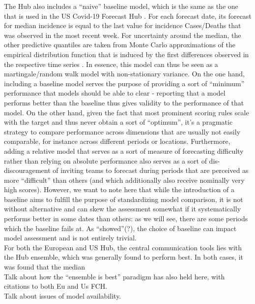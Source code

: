 The Hub also includes a ``naive'' baseline model, which is the same as the one that is used in the US Covid-19 Forecast Hub \cite{cramer_evaluation_2022}. For each forecast date, its forecast for median incidence is equal to the last value for incidence Cases/Deaths that was observed in the most recent week. For uncertainty around the median, the other predictive quantiles are taken from Monte Carlo approximations of the empirical distribution function that is induced by the first differences observed in the respective time series \citep{cramer_evaluation_2022}. In essence, this model can thus be seen as a martingale/random walk model with non-stationary variance. On the one hand, including a baseline model serves the purpose of providing a sort of ``minimum'' performance that models should be able to clear - reporting that a model performs better than the baseline thus gives validity to the performance of that model. On the other hand, given the fact that most prominent scoring rules scale with the target and thus never obtain a sort of ``optimum'', it's a pragmatic strategy to compare performance across dimensions that are usually not easily comparable, for instance across different periods or locations. Furthermore, adding a relative model that serves as a sort of measure of forecasting difficulty rather than relying on absolute performance also serves as a sort of dis-discouragement of inviting teams to forecast during periods that are perceived as more ``difficult'' than others (and which additionally also receive nominally very high scores). However, we want to note here that while the introduction of a baseline aims to fulfill the purpose of standardizing model comparison, it is not without alternative and can skew the assessment somewhat if it systematically performs better in some dates than others: as we will see, there are some periods which the baseline fails at. As \cite{bracher_evaluating_2021} ``showed''(?), the choice of baseline can impact model assessment and is not entirely trivial.\\
For both the European and US Hub, the central communication tools lies with the Hub ensemble, which was generally found to perform best. In both cases, it was found that the median  \\
Talk about how the ``ensemble is best'' paradigm has also held here, with citations to both Eu and Us FCH.\\
Talk about issues of model availability.\\
